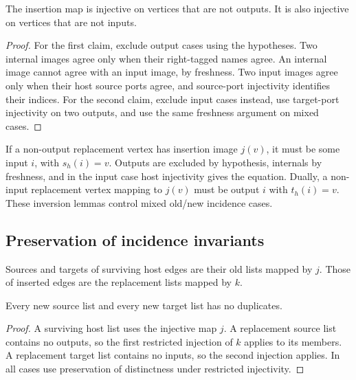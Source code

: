 \begin{lemma}
The insertion map is injective on vertices that are not outputs. It is also
injective on vertices that are not inputs.
\end{lemma}
\begin{proof}
For the first claim, exclude output cases using the hypotheses. Two internal
images agree only when their right-tagged names agree. An internal image cannot
agree with an input image, by freshness. Two input images agree only when their
host source ports agree, and source-port injectivity identifies their indices.
For the second claim, exclude input cases instead, use target-port injectivity
on two outputs, and use the same freshness argument on mixed cases.
\end{proof}
If a non-output replacement vertex has insertion image $j(v)$, it must be some
input $i$, with $s_h(i)=v$. Outputs are excluded by hypothesis, internals by
freshness, and in the input case host injectivity gives the equation. Dually, a
non-input replacement vertex mapping to $j(v)$ must be output $i$ with
$t_h(i)=v$. These inversion lemmas control mixed old/new incidence cases.

\subsection{Preservation of incidence invariants}
Sources and targets of surviving host edges are their old lists mapped by $j$.
Those of inserted edges are the replacement lists mapped by $k$.
\begin{lemma}
Every new source list and every new target list has no duplicates.
\end{lemma}
\begin{proof}
A surviving host list uses the injective map $j$. A replacement source list
contains no outputs, so the first restricted injection of $k$ applies to its
members. A replacement target list contains no inputs, so the second injection
applies. In all cases use preservation of distinctness under restricted injectivity.
\end{proof}

